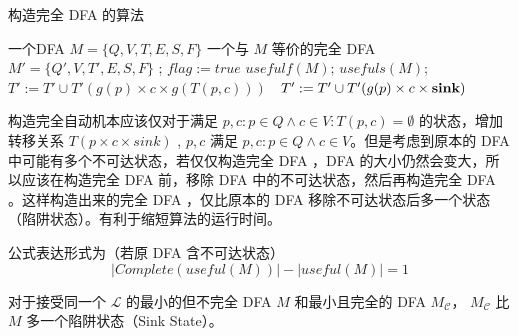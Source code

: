 \begin{algorithm}
    \caption{ 构造完全 DFA 的算法 }\label{al:complete-M}
    \begin{algorithmic}[1]
        \Require 一个DFA $M=\{Q,V,T,E,S,F\}$
        \Ensure 一个与 $M$ 等价的完全 DFA $M'=\{Q',V,T',E,S,F\}$
        \Statex {}
            ;
                         {$flag:=true$}
                    \EndIf
                \EndFor
            \EndFor
                \State $usefulf(M)$; 
                \State $usefuls(M)$; 
                            $T':= T' \cup T'(g(p)\times c \times g(T(p,c)))$
                        \Else
                            $~~T' := T' \cup T'(g(p)\times c \times \mbox{\bfseries sink})$
                        \EndIf
                    \EndFor
                \EndFor
            \EndIf
        \EndFunction
    \end{algorithmic}
\end{algorithm}

\begin{remark}
    构造完全自动机本应该仅对于满足 $ p,c:p\in Q \land c \in V: T(p,c)= \emptyset$ 的状态，增加转移关系 $T(p \times c \times sink)$ , $p,c$ 满足 $ p,c:p\in Q \land c \in V $。但是考虑到原本的 DFA 中可能有多个不可达状态，若仅仅构造完全 DFA ，DFA 的大小仍然会变大，所以应该在构造完全 DFA 前，移除 DFA 中的不可达状态，然后再构造完全 DFA 。这样构造出来的完全 DFA ，仅比原本的 DFA 移除不可达状态后多一个状态（陷阱状态）。有利于缩短算法的运行时间。
    
    公式表达形式为（若原 DFA 含不可达状态）
    \begin{equation}
        |Complete( useful (M))| -  |useful (M)| = 1
    \end{equation}
\end{remark}

\begin{remark}
    对于接受同一个 $\mathcal{L}$ 的最小的但不完全 DFA $M$ 和最小且完全的 DFA $M_{\mathcal{C}}$， $M_{\mathcal{C}}$ 比 $M$ 多一个陷阱状态（Sink State）\cite{watson1993taxonomyb}。
\end{remark}

